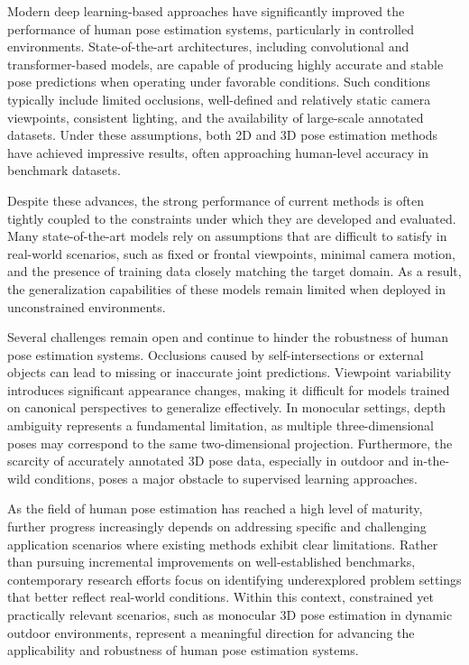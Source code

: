 Modern deep learning-based approaches have significantly improved the performance of human pose estimation systems, particularly in controlled environments.
State-of-the-art architectures, including convolutional and transformer-based models, are capable of producing highly accurate and stable pose predictions when operating under favorable conditions.
Such conditions typically include limited occlusions, well-defined and relatively static camera viewpoints, consistent lighting, and the availability of large-scale annotated datasets.
Under these assumptions, both 2D and 3D pose estimation methods have achieved impressive results, often approaching human-level accuracy in benchmark datasets.

Despite these advances, the strong performance of current methods is often tightly coupled to the constraints under which they are developed and evaluated.
Many state-of-the-art models rely on assumptions that are difficult to satisfy in real-world scenarios, such as fixed or frontal viewpoints, minimal camera motion, and the presence of training data closely matching the target domain.
As a result, the generalization capabilities of these models remain limited when deployed in unconstrained environments.

Several challenges remain open and continue to hinder the robustness of human pose estimation systems.
Occlusions caused by self-intersections or external objects can lead to missing or inaccurate joint predictions.
Viewpoint variability introduces significant appearance changes, making it difficult for models trained on canonical perspectives to generalize effectively.
In monocular settings, depth ambiguity represents a fundamental limitation, as multiple three-dimensional poses may correspond to the same two-dimensional projection.
Furthermore, the scarcity of accurately annotated 3D pose data, especially in outdoor and in-the-wild conditions, poses a major obstacle to supervised learning approaches.

As the field of human pose estimation has reached a high level of maturity, further progress increasingly depends on addressing specific and challenging application scenarios where existing methods exhibit clear limitations.
Rather than pursuing incremental improvements on well-established benchmarks, contemporary research efforts focus on identifying underexplored problem settings that better reflect real-world conditions.
Within this context, constrained yet practically relevant scenarios, such as monocular 3D pose estimation in dynamic outdoor environments, represent a meaningful direction for advancing the applicability and robustness of human pose 
estimation systems.

